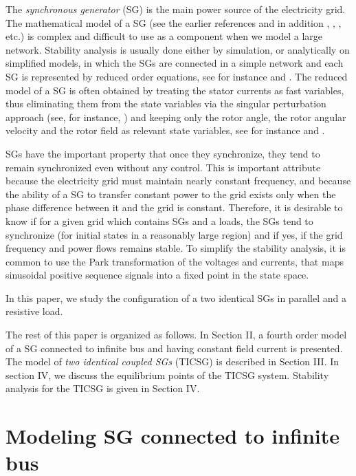 \documentclass[conference]{IEEEtran}
\begin{document}
The {\em synchronous generator} (SG) is the main power source of the
electricity grid. The mathematical model of a SG (see the earlier
references and in addition \cite{Walker:94}, \cite{Fitzgerald:03},
\cite{MaWe:15}, etc.) is complex and difficult to use as a component
when we model a large network. Stability analysis is usually done
either by simulation, or analytically on simplified models, in which
the SGs are connected in a simple network and each SG is represented
by reduced order equations, see for instance \cite{DoBull:12} and
\cite{PoDoBu:13}. The reduced model of a SG is often obtained by
treating the stator currents as fast variables, thus eliminating them
from the state variables via the singular perturbation approach (see,
for instance, \cite{Khalil}) and keeping only the rotor angle, the
rotor angular velocity and the rotor field as relevant state
variables, see for instance \cite{Kundur} and \cite{SauerPai1998}.

SGs have the important property that once they synchronize, they tend
to remain synchronized even without any control. This is important
attribute because the electricity grid must maintain nearly constant
frequency, and because the ability of a SG to transfer constant power
to the grid exists only when the phase difference between it and the
grid is constant. Therefore, it is desirable to know if for a given
grid which contains SGs and a loads, the SGs tend to synchronize (for
initial states in a reasonably large region) and if yes, if the grid
frequency and power flows remains stable. To simplify the stability
analysis, it is common to use the Park transformation of the voltages
and currents, that maps sinusoidal positive sequence signals into a
fixed point in the state space.

In this paper, we study the configuration of a two identical SGs in parallel and a resistive  load. 

The rest of this paper is organized as follows. In Section II, a
fourth order model of a SG connected to infinite bus and having
constant field current is presented. The model of {\em two identical coupled SGs} (TICSG) is described in Section III. In section IV, we discuss  the equilibrium points of the TICSG system.
Stability analysis for the TICSG is given in Section IV.

\section{Modeling SG connected to infinite bus}
\end{document}
